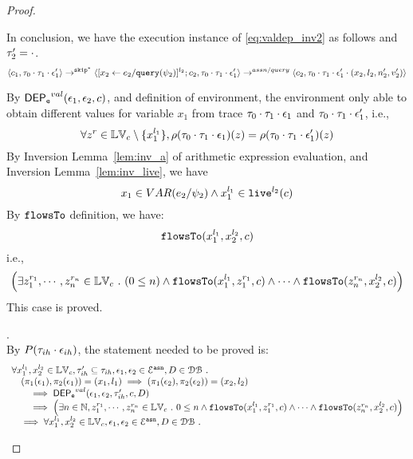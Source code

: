 \begin{proof}
\begin{case}[$P(\cdot)$]
\begin{subproof}[Subproof]
In conclusion, we have the execution instance of \ref{eq:valdep_inv2}  as follows and $\trace_2' = \cdot$.
  \[
  \langle c_1, \mathtt{\tau}_0 \cdot \mathtt{\tau}_1 \cdot \mathtt{\epsilon}_1' \rangle 
  \rightarrow^{\mathtt{skip}^*} 
  \langle [\mathrel{ {x}_2 \leftarrow e_2 / {\tt query}(\psi_2) }]^{l_2} ; {c}_2, \mathtt{\tau}_0 \cdot \mathtt{\tau}_1 \cdot \mathtt{\epsilon}_1' \rangle 
  \rightarrow^{assn/query} 
  \langle {c}_2,  \mathtt{\tau}_0 \cdot \mathtt{\tau}_1 \cdot \mathtt{\epsilon}_1' \cdot (x_2, l_2, n_2', v_2') \rangle 
 \]
\end{subproof}
%
By $\eventdep^{val}(\event_1, \event_2, c)$, and definition of environment, 
the environment only able to obtain different values for variable $x_1$ 
from trace $\vtrace_0 \cdot \vtrace_1 \cdot \event_1$ and 
$\vtrace_0 \cdot \vtrace_1 \cdot \event_1'$, i.e.,
\[
  \forall z^r \in \mathbb{LV}_c \setminus \{x_1^{l_1}\} ,
  \rho(\mathtt{\tau}_0 \cdot \mathtt{\tau}_1 \cdot \mathtt{\epsilon}_1) (z) =  
  \rho(\mathtt{\tau}_0 \cdot \mathtt{\tau}_1 \cdot \mathtt{\epsilon}_1') (z)
\]
%
By {Inversion Lemma~\ref{lem:inv_a}} of arithmetic expression evaluation, and Inversion Lemma~\ref{lem:inv_live}, we have 
\[
  x_1 \in VAR(e_2 / \psi_2) 
  \land x_1^{l_1} \in \mathtt{live}^{l_2}(c)
\]
%
By $\flowsto$ definition, we have:
%
\[
\mathtt{flowsTo}(x_1^{l_1}, {x}_2^{l_2}, c)
\]
i.e.,
%
\[
\Big(\exists z_1^{r_1}, \cdots, z_n^{r_n} \in \mathbb{LV}_{{c}} ~.~ (0 \leq n )
 \land \mathtt{flowsTo}(x_1^{l_1}, z_1^{r_1}, c) \land \cdots \land \mathtt{flowsTo}(z_n^{r_n}, {x}_2^{l_2}, c) \Big)
 \]
%
This case is proved.
\end{case}
%
\begin{case}
\label{case:valdep_ih}.
\\
%
By $P(\trace_{ih} \cdot \event_{ih})$, the statement needed to be proved is:
$$
\begin{array}{l}
\forall {x}_1^{l_1}, {x}_2^{l_2} \in \lvar_{{c}}, \trace_{ih}' \subseteq \trace_{ih},
\event_1, \event_2 \in \eventset^{\asn}, D \in \dbdom \st
\\ \quad
(\pi_{1}{(\event_1)}, \pi_{2}{(\event_1)}) = ({x}_1, l_1)
\implies
(\pi_{1}{(\event_2)}, \pi_{2}{(\event_2)}) = ({x}_2, l_2)
 \\ \qquad \implies 
\eventdep^{val}(\event_1, \event_2, \trace_{ih}', c, D)
 \\ \qquad \implies
   \Big(\exists  n \in \mathbb{N}, z_1^{r_1}, \cdots, z_n^{r_n} \in \lvar_{{c}} \st 0 \leq n
 \land \flowsto(x_1^{l_1}, z_1^{r_1}, c) \land \cdots \land \flowsto(z_n^{r_n}, {x}_2^{l_2}, c) \Big)
\\ \quad \implies
\forall {x}_1^{l_1}, {x}_2^{l_2} \in \lvar_{{c}},
\event_1, \event_2 \in \eventset^{\asn}, D \in \dbdom \st

\end{array}$$
\end{case}
\end{proof}
